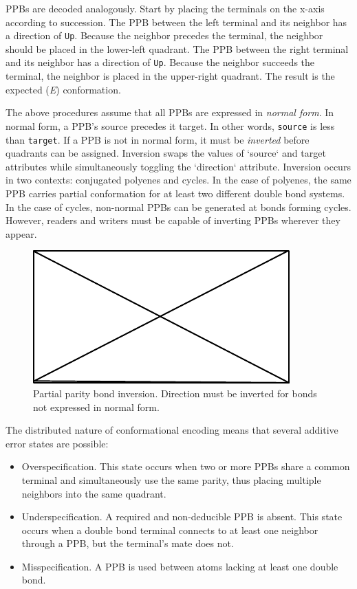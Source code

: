 \documentclass{article}
\def\ttt{\texttt}
\begin{document}
PPBs are decoded analogously. Start by placing the terminals on the x-axis according to succession. The PPB between the left terminal and its neighbor has a direction of \ttt{Up}. Because the neighbor precedes the terminal, the neighbor should be placed in the lower-left quadrant. The PPB between the right terminal and its neighbor has a direction of \ttt{Up}. Because the neighbor succeeds the terminal, the neighbor is placed in the upper-right quadrant. The result is the expected (\textit{E}) conformation.

The above procedures assume that all PPBs are expressed in \textit{normal form}. In normal form, a PPB's source precedes it target. In other words, \ttt{source} is less than \ttt{target}. If a PPB is not in normal form, it must be \textit{inverted} before quadrants can be assigned. Inversion swaps the values of `source` and target attributes while simultaneously toggling the `direction` attribute. Inversion occurs in two contexts: conjugated polyenes and cycles. In the case of polyenes, the same PPB carries partial conformation for at least two different double bond systems. In the case of cycles, non-normal PPBs can be generated at bonds forming cycles. However, readers and writers must be capable of inverting PPBs wherever they appear.

\begin{figure}
    \centering
    \includegraphics{filler}
    \caption{Partial parity bond inversion. Direction must be inverted for bonds not expressed in normal form.}
    \label{fig:ppb-inversion}
\end{figure}

The distributed nature of conformational encoding means that several additive error states are possible:

\begin{itemize}
    \item{Overspecification. This state occurs when two or more PPBs share a common terminal and simultaneously use the same parity, thus placing multiple neighbors into the same quadrant.}
    \item{Underspecification. A required and non-deducible PPB is absent. This state occurs when a double bond terminal connects to at least one neighbor through a PPB, but the terminal's mate does not.}
    \item{ Misspecification. A PPB is used between atoms lacking at least one double bond.}
\end{itemize}
\end{document}
